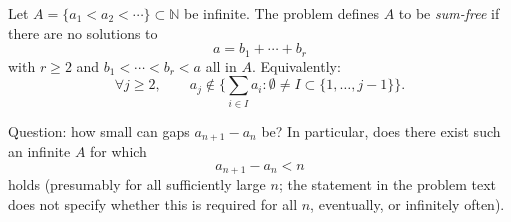 Let $A=\{a_1<a_2<\cdots\}\subset\mathbb N$ be infinite.
The problem defines $A$ to be \emph{sum-free} if there are no solutions to
\[
 a=b_1+\cdots+b_r
\]
with $r\ge 2$ and $b_1<\cdots<b_r<a$ all in $A$.
Equivalently:
\[
\forall j\ge 2,\qquad a_j\notin \Big\{\sum_{i\in I} a_i: \emptyset\neq I\subset\{1,\dots,j-1\}\Big\}.
\]

Question: how small can gaps $a_{n+1}-a_n$ be? In particular, does there exist such an infinite $A$ for which
\[
 a_{n+1}-a_n < n
\]
holds (presumably for all sufficiently large $n$; the statement in the problem text does not specify whether this is required for all $n$, eventually, or infinitely often).
